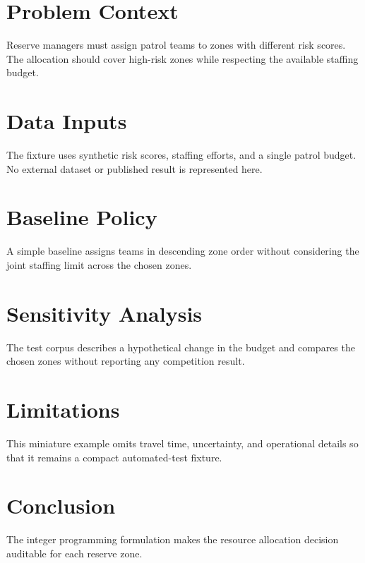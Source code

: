 \documentclass{article}
\begin{document}
\begin{abstract}
This synthetic fixture allocates limited patrol teams across wildlife reserve
zones.  It is solely an automated-test corpus, not a competition submission.
\end{abstract}

\section{Problem Context}
Reserve managers must assign patrol teams to zones with different risk scores.
The allocation should cover high-risk zones while respecting the available
staffing budget.



\section{Data Inputs}
The fixture uses synthetic risk scores, staffing efforts, and a single patrol
budget.  No external dataset or published result is represented here.

\section{Baseline Policy}
A simple baseline assigns teams in descending zone order without considering
the joint staffing limit across the chosen zones.

\section{Sensitivity Analysis}
The test corpus describes a hypothetical change in the budget and compares the
chosen zones without reporting any competition result.

\section{Limitations}
This miniature example omits travel time, uncertainty, and operational details
so that it remains a compact automated-test fixture.

\section{Conclusion}
The integer programming formulation makes the resource allocation decision
auditable for each reserve zone.
\end{document}
